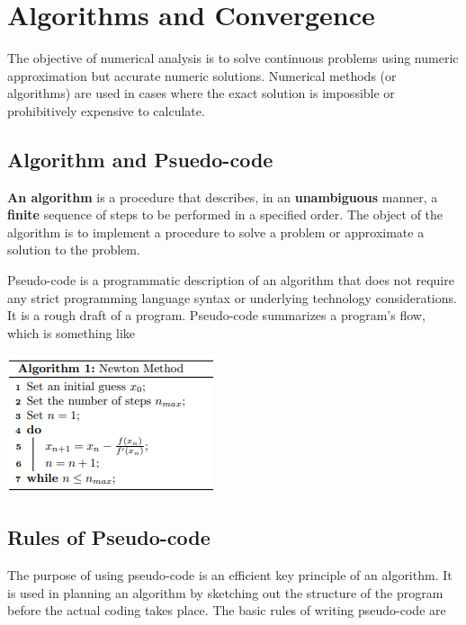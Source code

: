 \documentclass[
]{book}
\begin{document}
\hfill\break

\hypertarget{algorithms-and-convergence}{%
\section{Algorithms and Convergence}\label{algorithms-and-convergence}}

The objective of numerical analysis is to solve continuous problems using numeric approximation but accurate numeric solutions. Numerical methods (or algorithms) are used in cases where the exact solution is impossible or prohibitively expensive to calculate.

\hypertarget{algorithm-and-psuedo-code}{%
\subsection{Algorithm and Psuedo-code}\label{algorithm-and-psuedo-code}}

\textbf{An algorithm} is a procedure that describes, in an \textbf{unambiguous} manner, a \textbf{finite} sequence of steps to be performed in a specified order. The object of the algorithm is to implement a procedure to solve a problem or approximate a solution to the problem.

Pseudo-code is a programmatic description of an algorithm that does not require any strict programming language syntax or underlying technology considerations. It is a rough draft of a program. Pseudo-code summarizes a program's flow, which is something like

\begin{center}\includegraphics[width=0.3\linewidth]{img02/w02-Pseudo-Code} \end{center}

\hypertarget{rules-of-pseudo-code}{%
\subsection{Rules of Pseudo-code}\label{rules-of-pseudo-code}}

The purpose of using pseudo-code is an efficient key principle of an algorithm. It is used in planning an algorithm by sketching out the structure of the program before the actual coding takes place. The basic rules of writing pseudo-code are
\end{document}
